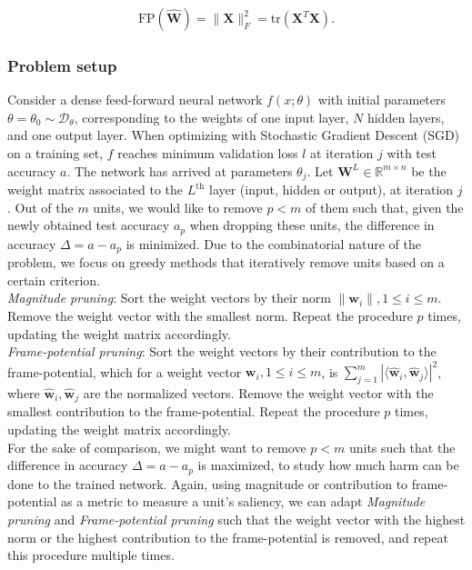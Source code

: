 \begin{align*}
\text{FP}(\hat{\mathbf{W}}) = \|\mathbf{X}\|_F^2 = \text{tr}(\mathbf{X}^T\mathbf{X}).
\end{align*}

\subsubsection*{Problem setup}
Consider a dense feed-forward neural network $f(x; \theta)$ with initial parameters $\theta = \theta_0 \sim \mathcal{D}_{\theta}$, corresponding to the weights of one input layer, $N$ hidden layers, and one output layer. When optimizing with Stochastic Gradient Descent (SGD) on a training set, $f$ reaches minimum validation loss $l$ at iteration $j$ with test accuracy $a$. The network has arrived at parameters $\theta_j$. Let $\mathbf{W}^L \in \mathbb{R}^{m \times n}$ be the weight matrix associated to the $L^{\text{th}}$ layer (input, hidden or output), at iteration $j$. Out of the $m$ units, we would like to remove $p < m$ of them such that, given the newly obtained test accuracy $a_p$ when dropping these units, the difference in accuracy $\Delta = a - a_p$ is minimized. Due to the combinatorial nature of the problem, we focus on greedy methods that iteratively remove units based on a certain criterion.  \\

\textit{Magnitude pruning}: Sort the weight vectors by their norm $\|\mathbf{w}_i\|, 1 \leq i \leq m$. Remove the weight vector with the smallest norm. Repeat the procedure $p$ times, updating the weight matrix accordingly. \\

\textit{Frame-potential pruning}: Sort the weight vectors by their contribution to the frame-potential, which for a weight vector $\mathbf{w}_i, 1 \leq i \leq m$, is $\sum\limits_{j=1}^m | \langle \hat{\mathbf{w}}_i, \hat{\mathbf{w}}_j \rangle |^2$, where $\hat{\mathbf{w}}_i, \hat{\mathbf{w}}_j$ are the normalized vectors. Remove the weight vector with the smallest contribution to the frame-potential. Repeat the procedure $p$ times, updating the weight matrix accordingly. \\

For the sake of comparison, we might want to remove $p < m$ units such that the difference in accuracy $\Delta = a - a_p$ is maximized, to study how much harm can be done to the trained network. Again, using magnitude or contribution to frame-potential as a metric to measure a unit's saliency, we can adapt \textit{Magnitude pruning} and \textit{Frame-potential pruning} such that the weight vector with the highest norm or the highest contribution to the frame-potential is removed, and repeat this procedure multiple times. \\

